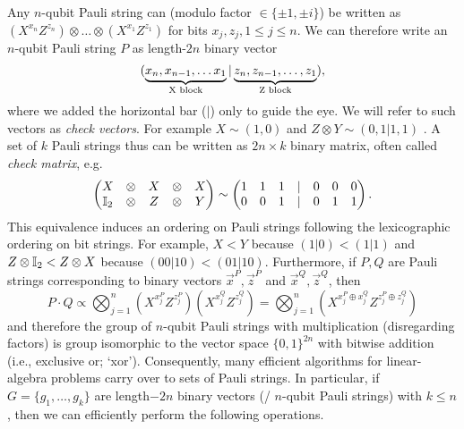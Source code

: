 Any $n$-qubit Pauli string can (modulo factor $\in \{\pm 1, \pm i\}$) be written as $(X^{x_n} Z^{z_n}) \otimes \dots \otimes (X^{x_1} Z^{z_1})$ for bits $x_j, z_j, 1 \leq j \leq n$.
We can therefore write an $n$-qubit Pauli string $P$ as length-$2n$ binary vector 
\[
    (\underbrace{x_n, x_{n-1}, \dots x_1}_{\textnormal{X block}} | \underbrace{z_n, z_{n-1}, \dots, z_1}_{\textnormal{Z block}})
    ,
\] 
where we added the horizontal bar ($|$) only to guide the eye.
We will refer to such vectors as \emph{check vectors}.
For example $X \sim (1, 0)$ and $Z \otimes Y \sim (0, 1 | 1, 1)$ \cite{aaronson2008improved}.
A set of $k$ Pauli strings thus can be written as $2n\times k$ binary matrix, often called \emph{check matrix}, e.g.
\[
    \begin{pmatrix}
        X &\otimes& X &\otimes& X\\
        \id[2] &\otimes& Z &\otimes& Y
    \end{pmatrix}
    \sim
    \begin{pmatrix}
        1& 1& 1& |& 0& 0& 0\\
        0& 0& 1& |& 0& 1& 1
    \end{pmatrix}
    .
\]
This equivalence induces an ordering on Pauli strings following the lexicographic ordering on bit strings. %
For example, $X<Y$ because $(1|0) < (1|1)$ and $Z\otimes \id[2] < Z \otimes X$ because $(0 0 | 1 0) < (0 1 | 1 0)$.
Furthermore, if $P, Q$ are Pauli strings corresponding to binary vectors $\vec{x}^P, \vec{z}^P$ and $\vec{x}^Q, \vec{z}^Q$, then 
\[
P \cdot Q \propto
\bigotimes_{j=1}^n
\left(X^{x^P_j} Z^{z^P_j}\right) \left(X^{x^Q_j} Z^{z^Q_j}\right) 
=
\bigotimes_{j=1}^n
\left(X^{x^P_j \oplus x^Q_j } Z^{z^P_j \oplus z^Q_j} \right)
\]
and therefore the group of $n$-qubit Pauli strings with multiplication (disregarding factors) is group isomorphic to the vector space $\{0, 1\}^{2n}$ with bitwise addition (i.e., exclusive or; `xor').
Consequently, many efficient algorithms for linear-algebra problems carry over to sets of Pauli strings.
In particular, if $G = \{g_1, \dots, g_k\}$ are length$-2n$ binary vectors (/ $n$-qubit Pauli strings) with $k\leq n$, then we can efficiently perform the following operations.

